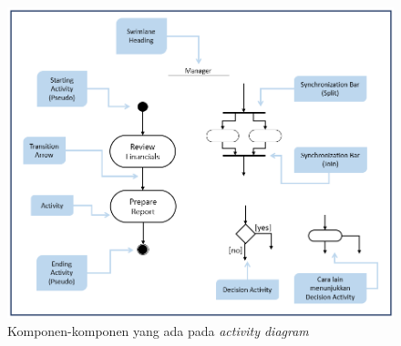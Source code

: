 \documentclass[a4paper]{article}
\begin{document}
\begin{enumerate}
    \begin{figure}[h]
        \centering
        \includegraphics[scale=0.5]{images/uml satzinger/activity diagram/rangkuman komponen activity diagram.png}
        \caption{Komponen-komponen yang ada pada \textit{activity diagram}}
        \label{fig:activitynotation}
    \end{figure}


\end{enumerate}
\end{document}
